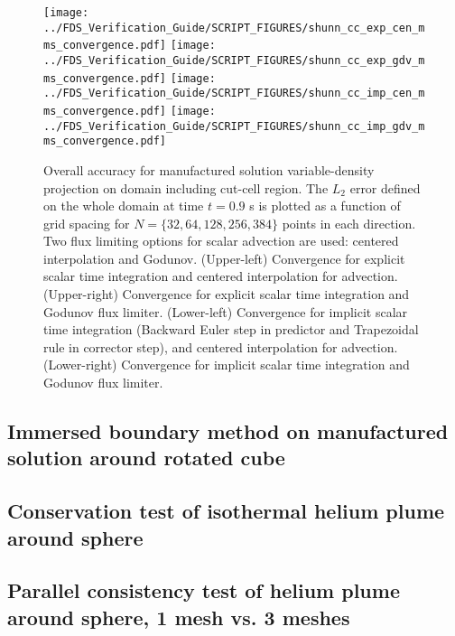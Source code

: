 \documentclass[12pt]{article}
\begin{document}
\begin{figure}[ht]
\centering
\texttt{[image: ../FDS\_Verification\_Guide/SCRIPT\_FIGURES/shunn\_cc\_exp\_cen\_mms\_convergence.pdf]}
\texttt{[image: ../FDS\_Verification\_Guide/SCRIPT\_FIGURES/shunn\_cc\_exp\_gdv\_mms\_convergence.pdf]}
\texttt{[image: ../FDS\_Verification\_Guide/SCRIPT\_FIGURES/shunn\_cc\_imp\_cen\_mms\_convergence.pdf]}
\texttt{[image: ../FDS\_Verification\_Guide/SCRIPT\_FIGURES/shunn\_cc\_imp\_gdv\_mms\_convergence.pdf]}
\caption[The {\ct Shunn CC} accuracy order test case]{Overall accuracy for manufactured solution variable-density projection on domain including cut-cell region. The $L_2$ error defined on the whole domain at time $t = 0.9$ s is plotted as a function of grid spacing for $N=\{32,64,128,256,384\}$ points in each direction. Two flux limiting options for scalar advection are used: centered interpolation and Godunov.  (Upper-left) Convergence for explicit scalar time integration and centered interpolation for advection.  (Upper-right) Convergence for explicit scalar time integration and Godunov flux limiter.  (Lower-left) Convergence for implicit scalar time integration (Backward Euler step in predictor and Trapezoidal rule in corrector step), and  centered interpolation for advection. (Lower-right) Convergence for implicit scalar time integration and Godunov flux limiter.  }\label{fig:shunn_cc_accuracy_order}
\end{figure}





\subsection{Immersed boundary method on manufactured solution around rotated cube}





\subsection{Conservation test of isothermal helium plume around sphere}





\subsection{Parallel consistency test of helium plume around sphere, 1 mesh vs. 3 meshes}
\end{document}
